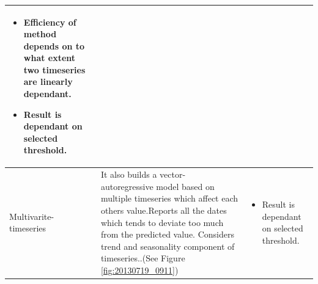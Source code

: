 \begin{table}[H]
{\begin{tabular}{|L{3cm} | L{5cm} | L{8cm}|}
\begin{itemize}
                                                                                                                                                                                                                                                                                                                  \item Efficiency of method depends on to what extent two timeseries are linearly dependant.
                                                                                                                                                                                                                                                                                                                  \item Result is dependant on selected threshold.                                                                                                                                                                                                                                                        
                                                                                                                                                                                                                                                                                                                 \end{itemize}
  \\ \hline
Multivarite- timeseries               & It also builds a vector- autoregressive model based on multiple timeseries which affect each others value.Reports all the dates which tends to deviate too much from the predicted value. Considers trend and seasonality component of timeseries..(See Figure \ref{fig:20130719_0911}) & \begin{itemize}
                                                                                                                                                                                                                                                                                                                  \item Result is dependant on selected threshold.
                                                                                                                                                                                                                                                                                                                 \end{itemize}                                                                                                                                                                                                                                                                                                                                                \\ \hline

\end{tabular}}
\end{table}
